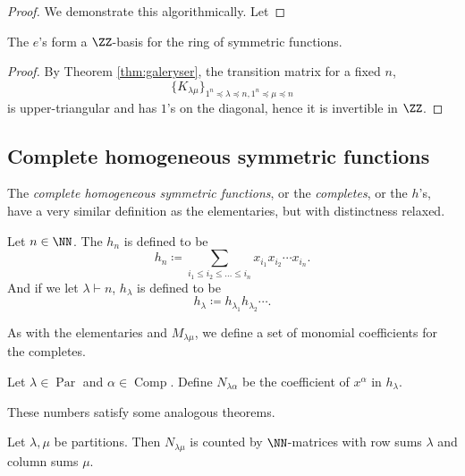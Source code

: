 \documentclass{article}
\DeclareMathOperator{\Par}{Par}
\DeclareMathOperator{\Com}{Comp}
\begin{document}
\begin{proof}
    We demonstrate this algorithmically. 
    Let
\end{proof}

\begin{theorem} The $e$'s form a $\ZZ$-basis for the ring of symmetric functions.
\end{theorem}

\begin{proof}
    By Theorem \ref{thm:galeryser}, the transition matrix for a fixed $n$,
    \[
        \{K_{\lambda\mu}\}_{1^n \preceq \lambda \preceq n, 1^n \preceq \mu \preceq n}
    \]
    is upper-triangular and has $1$'s on the diagonal, hence it is invertible in $\ZZ$. 
\end{proof}

\subsection{Complete homogeneous symmetric functions}

The \textit{complete homogeneous symmetric functions}, or the \textit{completes}, or the $h$'s, have a very similar definition as the elementaries, but with distinctness relaxed.

\begin{definition}
    Let $n\in\NN$. The  $h_n$ is defined to be
    \[
        h_n \coloneq \sum_{i_1\leq i_2\leq\ldots\leq i_n} x_{i_1}x_{i_2}\cdots x_{i_n}.
    \]
    And if we let $\lambda \vdash n$, $h_\lambda$ is defined to be
    \[
        h_\lambda \coloneq h_{\lambda_1}h_{\lambda_2}\cdots.
    \]
\end{definition}

As with the elementaries and $M_{\lambda\mu}$, we define a set of monomial coefficients for the completes.

\begin{definition}
    Let $\lambda \in \Par$ and $\alpha \in \Com$. Define $N_{\lambda\alpha}$ be the coefficient of $x^\alpha$ in $h_\lambda$.
\end{definition}

These numbers satisfy some analogous theorems.

\begin{theorem} \label{thm:h2mCombInterpretation}
    Let $\lambda, \mu$ be partitions. Then $N_{\lambda\mu}$ is counted by $\NN$-matrices with row sums $\lambda$ and column sums $\mu$.
\end{theorem}
\end{document}
